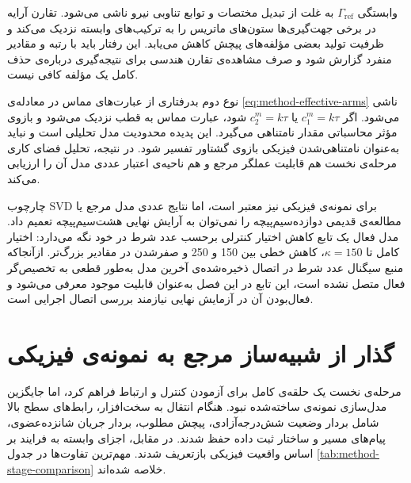 وابستگی $\Gamma_{\mathrm{ref}}$ به غلت از تبدیل مختصات و توابع تناوبی نیرو ناشی می‌شود. تقارن آرایه در برخی جهت‌گیری‌ها ستون‌های ماتریس را به ترکیب‌های وابسته نزدیک می‌کند و ظرفیت تولید بعضی مؤلفه‌های پیچش کاهش می‌یابد. این رفتار باید با رتبه و مقادیر منفرد گزارش شود و صرف مشاهده‌ی تقارن هندسی برای نتیجه‌گیری درباره‌ی حذف کامل یک مؤلفه کافی نیست.

نوع دوم بدرفتاری از عبارت‌های مماس در معادله‌ی \ref{eq:method-effective-arms} ناشی می‌شود. اگر $c_1^m=k\tau$ یا $c_2^m=k\tau$ شود، عبارت مماس به قطب نزدیک می‌شود و بازوی مؤثر محاسباتی مقدار نامتناهی می‌گیرد. این پدیده محدودیت مدل تحلیلی است و نباید به‌عنوان نامتناهی‌شدن فیزیکی بازوی گشتاور تفسیر شود. در نتیجه، تحلیل فضای کاری مرحله‌ی نخست هم قابلیت عملگر مرجع و هم ناحیه‌ی اعتبار عددی مدل آن را ارزیابی می‌کند.

چارچوب SVD برای نمونه‌ی فیزیکی نیز معتبر است، اما نتایج عددی مدل مرجع یا مطالعه‌ی قدیمی دوازده‌سیم‌پیچه را نمی‌توان به آرایش نهایی هشت‌سیم‌پیچه تعمیم داد. مدل فعال یک تابع کاهش اختیار کنترلی برحسب عدد شرط در خود نگه می‌دارد: اختیار کامل تا $\kappa=150$، کاهش خطی بین 150 و 250 و صفرشدن در مقادیر بزرگ‌تر. ازآنجاکه منبع سیگنال عدد شرط در اتصال ذخیره‌شده‌ی آخرین مدل به‌طور قطعی به تخصیص‌گر فعال متصل نشده است، این تابع در این فصل به‌عنوان قابلیت موجود معرفی می‌شود و فعال‌بودن آن در آزمایش نهایی نیازمند بررسی اتصال اجرایی است.

\section{گذار از شبیه‌ساز مرجع به نمونه‌ی فیزیکی}
\label{sec:method-transition-hardware}

مرحله‌ی نخست یک حلقه‌ی کامل برای آزمودن کنترل و ارتباط فراهم کرد، اما جایگزین مدل‌سازی نمونه‌ی ساخته‌شده نبود. هنگام انتقال به سخت‌افزار، رابط‌های سطح بالا شامل بردار وضعیت شش‌درجه‌آزادی، پیچش مطلوب، بردار جریان شانزده‌عضوی، پیام‌های مسیر و ساختار ثبت داده حفظ شدند. در مقابل، اجزای وابسته به فرایند بر اساس واقعیت فیزیکی بازتعریف شدند. مهم‌ترین تفاوت‌ها در جدول \ref{tab:method-stage-comparison} خلاصه شده‌اند.

